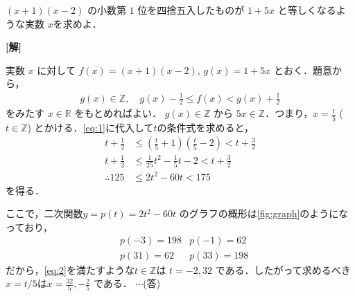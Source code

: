 \documentclass[a4paper,10pt]{ltjsarticle}
\begin{document}
\begin{oframed}
$(x+1)(x-2)$ の小数第 $1$ 位を四捨五入したものが $1+5x$ と等しくなるような実数 $x$を求めよ．
\end{oframed}
\setlength{\columnseprule}{0.4pt}
\begin{multicols}{2}
{\bf[解]}

実数 $x$ に対して $f(x) = (x+1)(x-2)$, $g(x) = 1+5x$ とおく．題意から，
    \begin{align}\label{eq:1}
        g(x) \in \mathbb{Z}, \quad g(x) - \frac{1}{2} \le f(x) < g(x) + \frac{1}{2} 
    \end{align}
    をみたす $x \in \mathbb{R}$ をもとめればよい．
    $g(x) \in \mathbb{Z}$ から $5x \in \mathbb{Z}$．つまり，$x = \frac{t}{5}$ ($t \in \mathbb{Z}$)
    とかける．\cref{eq:1}に代入して$t$の条件式を求めると，
    \begin{align}
        t + \frac{1}{2} &\le \left(\frac{t}{5}+1\right)\left(\frac{t}{5}-2\right) < t+\frac{3}{2} \nonumber \\
        t + \frac{1}{2} &\le \frac{1}{25}t^2  - \frac{1}{5}t - 2 < t+\frac{3}{2} \nonumber \\
        \therefore 125 &\le 2t^2 - 60t < 175 \label{eq:2}
    \end{align}
    を得る．

    ここで，二次関数$y = p(t) = 2t^2 - 60t$ のグラフの概形は\cref{fig:graph}のようになっており，
    \begin{align*}
     &p(-3) = 198 & p(-1) = 62 \\
     &p(31) = 62  & p(33) = 198 
    \end{align*}
    だから，\cref{eq:2}を満たすような$t \in \mathbb{Z}$は $t=-2, 32$ である．したがって求めるべき$x=t/5$は$x = \frac{32}{5}, -\frac{2}{5}$ である． $\cdots$(答)

\begin{figure}[H]
     \centering
\def\yBoundaryLower{125}
\def\yBoundaryUpper{175}
\def\yAtIntPoints{128} %




\end{figure}
\end{multicols}
\end{document}
